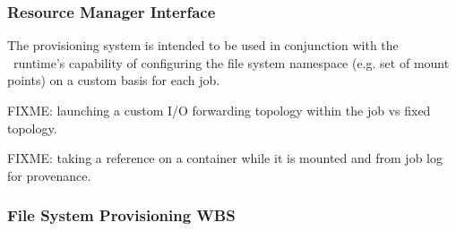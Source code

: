 \subsubsection{Resource Manager Interface}

The provisioning system is intended to be used in conjunction with
the \ngrm\ runtime's capability of configuring the file system
namespace (e.g. set of mount points) on a custom basis for each job. 

FIXME: launching a custom I/O forwarding topology within the job
vs fixed topology.

FIXME: taking a reference on a container while it is mounted and
from job log for provenance.

\subsubsection{File System Provisioning WBS}

